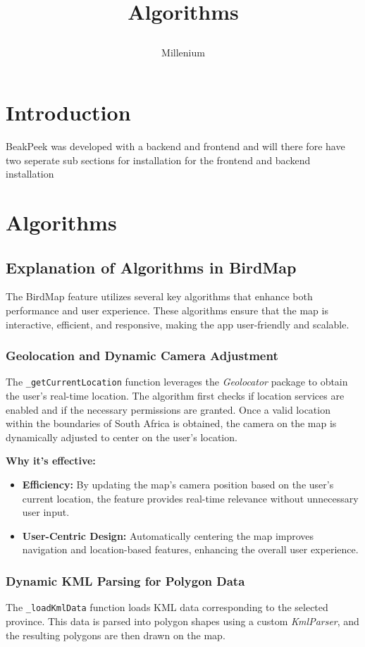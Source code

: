 \documentclass{article}
\title{

\\
{Algorithms}
}
\author{Millenium}
\begin{document}
\tableofcontents

\newpage


\section{Introduction}


BeakPeek was developed with a backend and frontend and will there fore have two
seperate sub sections for installation for the frontend and backend installation
\section{Algorithms}
\subsection{Explanation of Algorithms in BirdMap}

The BirdMap feature utilizes several key algorithms that enhance both performance and user experience. These algorithms ensure that the map is interactive, efficient, and responsive, making the app user-friendly and scalable.

\subsubsection{Geolocation and Dynamic Camera Adjustment}
The \texttt{\_getCurrentLocation} function leverages the \textit{Geolocator} package to obtain the user’s real-time location. The algorithm first checks if location services are enabled and if the necessary permissions are granted. Once a valid location within the boundaries of South Africa is obtained, the camera on the map is dynamically adjusted to center on the user’s location.

\textbf{Why it's effective:}
\begin{itemize}
    \item \textbf{Efficiency:} By updating the map's camera position based on the user’s current location, the feature provides real-time relevance without unnecessary user input.
    \item \textbf{User-Centric Design:} Automatically centering the map improves navigation and location-based features, enhancing the overall user experience.
\end{itemize}

\subsubsection{Dynamic KML Parsing for Polygon Data}
The \texttt{\_loadKmlData} function loads KML data corresponding to the selected province. This data is parsed into polygon shapes using a custom \textit{KmlParser}, and the resulting polygons are then drawn on the map.
\end{document}
